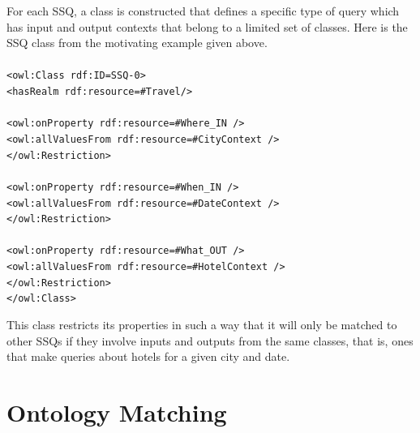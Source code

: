 \documentclass{IOS-Book-Article}
\begin{document}
For each SSQ, a class is constructed that defines a specific type of query which has input and output contexts that belong to a limited set of classes.  Here is the SSQ class from the motivating example given above.
\texttt{\small{
\\
\\
\indent <owl:Class rdf:ID=\textquotedbl{}SSQ-0\textquotedbl{}>\\
\indent \indent <hasRealm rdf:resource=\textquotedbl{}\#Travel\textquotedbl{}/>\\
\indent {}\\
\indent \indent \indent <owl:onProperty rdf:resource=\textquotedbl{}\#Where\_IN\textquotedbl{} />\\
\indent \indent \indent <owl:allValuesFrom rdf:resource=\textquotedbl{}\#CityContext\textquotedbl{} />\\
\nopagebreak\indent \indent </owl:Restriction>\\
\indent {}\\
\nopagebreak\indent \indent \indent <owl:onProperty rdf:resource=\textquotedbl{}\#When\_IN\textquotedbl{} />\\
\indent\indent\indent <owl:allValuesFrom
rdf:resource=\textquotedbl{}\#DateContext\textquotedbl{} />\\
\indent\indent </owl:Restriction>\\
\indent {}\nopagebreak\\
\nopagebreak\indent \indent \indent <owl:onProperty 
rdf:resource=\textquotedbl{}\#What\_OUT\textquotedbl{} />\\
\indent \indent \indent <owl:allValuesFrom rdf:resource=\textquotedbl{}\#HotelContext\textquotedbl{} />\\
\indent \indent </owl:Restriction>\\
\indent </owl:Class>\\
}}

This class restricts its properties in such a way that it will only be matched to other SSQs if they involve inputs and outputs from the same classes, that is, ones that make queries about hotels for a given city and date.


\section{Ontology Matching}
\end{document}
